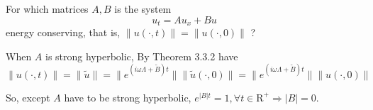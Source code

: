 \exc For which matrices $A, B$ is the system
\[u_t = Au_x + Bu\]
energy conserving, that is, $\lVert u(·,t) \rVert
=\lVert u(·, 0) \rVert$ ?

\begin{solution}
    When $A$ is strong hyperbolic, By Theorem 3.3.2 have
    \[\lVert u(\cdot ,t) \rVert = \|\tilde{u}\| =
    \|e^{(i\omega \Lambda + \tilde{B})t}\| \|\tilde{u}(\cdot, 0)\|
=\|e^{(i\omega \Lambda + \tilde{B})t}\| \|u(\cdot, 0)\| \]

So, except $A$ have to be strong hyperbolic, 
$e^{|B|t} = 1, \forall t \in \mathrm{R}^+ \Rightarrow |B| = 0$.

    

\end{solution}